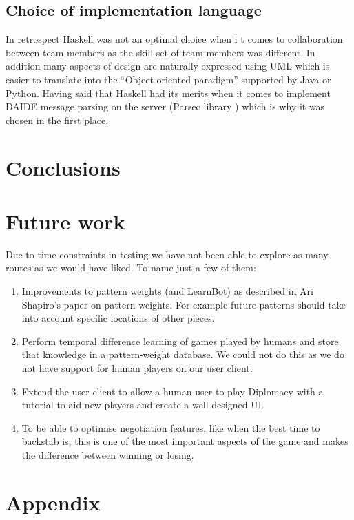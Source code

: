 \documentclass[pdftex,12pt,a4paper]{report}
\begin{document}
\subsection{Choice of implementation language}
In retrospect Haskell was not an optimal choice when i t comes to
collaboration between team members as the skill-set of team members
was different. In addition many aspects of design are naturally
expressed using UML which is easier to translate into the
``Object-oriented paradigm'' supported by Java or Python.
Having said that Haskell had its merits when it comes to implement
DAIDE message parsing on the server (Parsec library \cite{ParsecLib}) 
which is why it was chosen in the first place.

\pagebreak

\section{Conclusions}


\pagebreak

\section{Future work}

Due to time constraints in testing we have not been able to explore as
many routes as we would have liked. To name just a few of them: 
\\
\begin{enumerate}

\item Improvements to pattern weights (and LearnBot) as described in 
Ari Shapiro's paper on pattern weights. For example future patterns should take 
into account specific locations of other pieces.

\item Perform temporal difference learning of games played by humans and store 
that knowledge in a pattern-weight database. We could not do this as we do not have 
support for human players on our user client.

\item Extend the user client to allow a human user to play Diplomacy with a 
tutorial to aid new players and create a well designed UI.
\item To be able to optimise negotiation features, like when the best time to 
backstab is, this is one of the most important aspects of the game and makes 
the difference between winning or losing.
\end{enumerate}



\pagebreak

\section{Appendix}


 
\end{document}
